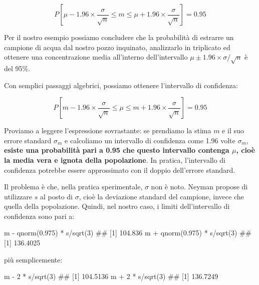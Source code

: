\documentclass[a4paper,12pt,oneside]{book}
\newenvironment{Shaded}{\begin{snugshade}}{\end{snugshade}}
\newcommand{\DecValTok}[1]{#1}
\newcommand{\FloatTok}[1]{#1}
\newcommand{\SpecialCharTok}[1]{#1}
\newcommand{\DocumentationTok}[1]{#1}
\newcommand{\FunctionTok}[1]{#1}
\newcommand{\NormalTok}[1]{#1}
\begin{document}
\[ P \left[ \mu - 1.96 \times \frac{\sigma}{\sqrt{n} } \leq m \leq \mu + 1.96 \times \frac{\sigma}{\sqrt{n} } \right] = 0.95 \]

Per il nostro esempio possiamo concludere che la probabilità di estrarre un campione di acqua dal nostro pozzo inquinato, analizzarlo in triplicato ed ottenere una concentrazione media all'interno dell'intervallo \(\mu \pm 1.96 \times\sigma/\sqrt{n}\) è del 95\%.

Con semplici passaggi algebrici, possiamo ottenere l'intervallo di confidenza:

\[ P \left[ m - 1.96 \times \frac{\sigma}{\sqrt{n} } \leq \mu \leq m + 1.96 \times \frac{\sigma}{\sqrt{n} } \right] = 0.95 \]

Proviamo a leggere l'espressione sovrastante: se prendiamo la stima \(m\) e il suo errore standard \(\sigma_m\) e calcoliamo un intervallo di confidenza come 1.96 volte \(\sigma_m\), \textbf{esiste una probabilità pari a 0.95 che questo intervallo contenga \(\mu\), cioè la media vera e ignota della popolazione}. In pratica, l'intervallo di confidenza potrebbe essere approssimato con il doppio dell'errore standard.

Il problema è che, nella pratica sperimentale, \(\sigma\) non è noto. Neyman propose di utilizzare \(s\) al posto di \(\sigma\), cioè la deviazione standard del campione, invece che quella della popolazione. Quindi, nel nostro caso, i limiti dell'intervallo di confidenza sono pari a:

\begin{Shaded}
\begin{Highlighting}[]
\NormalTok{m }\SpecialCharTok{{-}} \FunctionTok{qnorm}\NormalTok{(}\FloatTok{0.975}\NormalTok{) }\SpecialCharTok{*}\NormalTok{ s}\SpecialCharTok{/}\FunctionTok{sqrt}\NormalTok{(}\DecValTok{3}\NormalTok{)}
\DocumentationTok{\#\# [1] 104.836}
\NormalTok{m }\SpecialCharTok{+} \FunctionTok{qnorm}\NormalTok{(}\FloatTok{0.975}\NormalTok{) }\SpecialCharTok{*}\NormalTok{ s}\SpecialCharTok{/}\FunctionTok{sqrt}\NormalTok{(}\DecValTok{3}\NormalTok{)}
\DocumentationTok{\#\# [1] 136.4025}
\end{Highlighting}
\end{Shaded}

più semplicemente:

\begin{Shaded}
\begin{Highlighting}[]
\NormalTok{m }\SpecialCharTok{{-}} \DecValTok{2} \SpecialCharTok{*}\NormalTok{ s}\SpecialCharTok{/}\FunctionTok{sqrt}\NormalTok{(}\DecValTok{3}\NormalTok{)}
\DocumentationTok{\#\# [1] 104.5136}
\NormalTok{m }\SpecialCharTok{+} \DecValTok{2} \SpecialCharTok{*}\NormalTok{ s}\SpecialCharTok{/}\FunctionTok{sqrt}\NormalTok{(}\DecValTok{3}\NormalTok{)}
\DocumentationTok{\#\# [1] 136.7249}
\end{Highlighting}
\end{Shaded}
\end{document}
